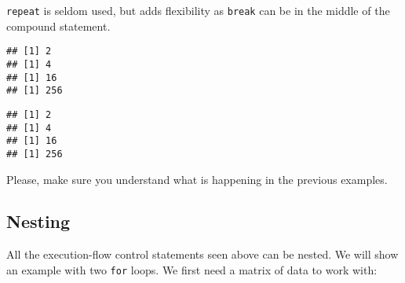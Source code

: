 \documentclass[paper=a4,10pt,div=17,headsepline,BCOR=12mm,twoside,open=right]{scrbook}\usepackage{knitr}
\begin{document}
\texttt{repeat} is seldom used, but adds flexibility as \texttt{break} can be in the middle of the compound statement.

\begin{knitrout}\footnotesize
{}\color{fgcolor}\begin{kframe}
\begin{alltt}
 \hlkwb{<-} 
\hlstd{\{}
   \hlkwb{<-} \hlopt{^}
    \hlopt{>} \hlstd{) \{} \hlstd{()\}}
\hlstd{\}}
\end{alltt}
\begin{verbatim}
## [1] 2
## [1] 4
## [1] 16
## [1] 256
\end{verbatim}
\begin{alltt}
 \hlkwb{<-} 
\hlstd{\{}
    \hlopt{>} \hlstd{)} \hlstd{()}
   \hlkwb{<-} \hlopt{^}
\hlstd{\}}
\end{alltt}
\begin{verbatim}
## [1] 2
## [1] 4
## [1] 16
## [1] 256
\end{verbatim}
\end{kframe}
\end{knitrout}

Please, make sure you understand what is happening in the previous examples.

\subsection{Nesting}

All the execution-flow control statements seen above can be nested. We will show an example with two \texttt{for} loops. We first need a matrix of data to work with:
\end{document}
